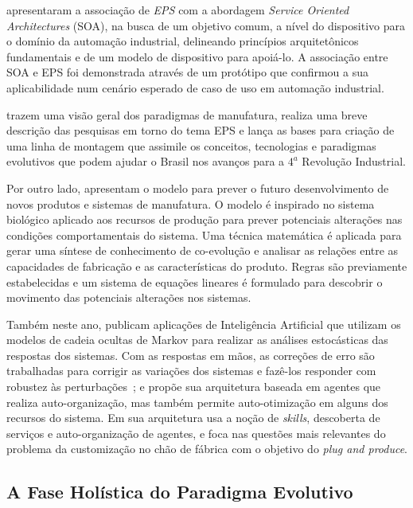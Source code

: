 \cite{CANDIDO2011} apresentaram a associação de \textit{EPS} com a abordagem \textit{Service Oriented Architectures} (SOA), na  busca de um objetivo comum, a nível do dispositivo para o domínio da automação industrial, delineando princípios arquitetônicos fundamentais e de um modelo de dispositivo para apoiá-lo. A associação entre SOA e EPS foi demonstrada através de um protótipo que confirmou a sua aplicabilidade num cenário esperado de caso de uso em automação industrial.

\cite{CAVALCANTE2012a} trazem uma visão geral dos paradigmas de manufatura, realiza uma breve descrição das pesquisas em torno do tema EPS e lança as bases para criação de uma linha de montagem que assimile os conceitos, tecnologias e paradigmas evolutivos que podem ajudar o Brasil nos avanços para a $4^a$ Revolução Industrial.

Por outro lado, \cite{AlGeddawy2012} apresentam o modelo para prever o futuro desenvolvimento de novos produtos e sistemas de manufatura. O modelo é inspirado no sistema biológico aplicado aos recursos de produção para prever potenciais alterações nas condições comportamentais do sistema. Uma técnica matemática é aplicada para gerar uma síntese de conhecimento de co-evolução e analisar as relações entre as capacidades de fabricação e as características do produto. Regras são previamente estabelecidas e um sistema de equações lineares é formulado para descobrir o movimento das potenciais alterações nos sistemas.

Também neste ano, \cite{RIBEIRO2012b} publicam aplicações de Inteligência Artificial que utilizam os modelos de cadeia ocultas de Markov para realizar as análises estocásticas das respostas dos sistemas. Com as respostas em mãos, as correções de erro são trabalhadas para corrigir as variações dos sistemas e fazê-los responder com robustez às perturbações~\cite{RIBEIRO2012b,RIBEIRO2012a}; e \cite{CAVALCANTE2012} propõe sua arquitetura baseada em agentes que realiza auto-organização, mas também permite auto-otimização em alguns dos recursos do sistema. Em sua arquitetura usa a noção de \textit{skills}, descoberta de serviços e auto-organização de agentes, e foca nas questões mais relevantes do problema da customização no chão de fábrica com o objetivo do \textit{plug and produce}.


\subsection{A Fase Holística do Paradigma Evolutivo}

